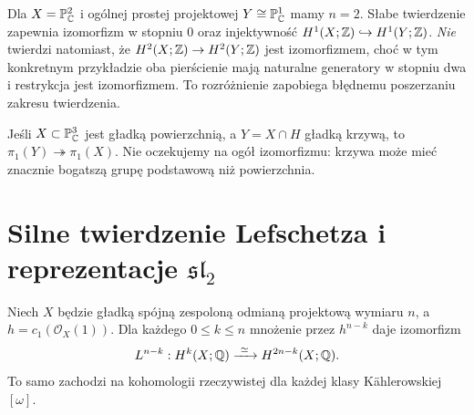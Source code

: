 \begin{przyklad}
Dla $X=\mathbb P^2_{\mathbb{C}}$ i ogólnej prostej projektowej
$Y\cong\mathbb P^1_{\mathbb{C}}$ mamy $n=2$.
Słabe twierdzenie zapewnia izomorfizm w stopniu $0$ oraz
injektywność $H^1(X;\mathbb{Z})\hookrightarrow H^1(Y;\mathbb{Z})$.
\emph{Nie} twierdzi natomiast, że $H^2(X;\mathbb{Z})\to H^2(Y;\mathbb{Z})$
jest izomorfizmem, choć w tym konkretnym przykładzie oba
pierścienie mają naturalne generatory w stopniu dwa i restrykcja
jest izomorfizmem. To rozróżnienie zapobiega błędnemu
poszerzaniu zakresu twierdzenia.
\end{przyklad}

\begin{przyklad}
Jeśli $X\subset\mathbb P^3_{\mathbb{C}}$ jest gładką powierzchnią,
a $Y=X\cap H$ gładką krzywą, to $\pi_1(Y)\twoheadrightarrow\pi_1(X)$.
Nie oczekujemy na ogół izomorfizmu: krzywa może mieć
znacznie bogatszą grupę podstawową niż powierzchnia.
\end{przyklad}

\section{Silne twierdzenie Lefschetza i reprezentacje $\mathfrak{sl}_2$}
\begin{twierdzenie}
\label{thm:xvii-hard-lefschetz}
Niech $X$ będzie gładką spójną zespoloną odmianą projektową
wymiaru $n$, a $h=c_1(\mathcal O_X(1))$.
Dla każdego $0\le k\le n$ mnożenie przez $h^{n-k}$ daje izomorfizm
\[
L^{n-k}:H^k(X;\Q)\xrightarrow{\ \simeq\ }H^{2n-k}(X;\Q).
\]
To samo zachodzi na kohomologii rzeczywistej dla każdej
klasy Kählerowskiej $[\omega]$.
\end{twierdzenie}

